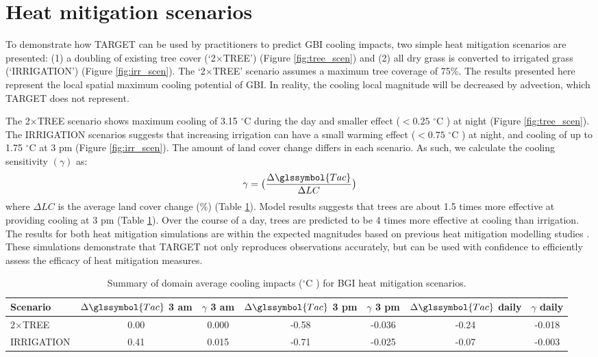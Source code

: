 \documentclass[final,3p,times,authoryear]{elsarticle}
\newcommand{\degreeC}{\ensuremath{^\circ}C }
\begin{document}
\section{Heat mitigation scenarios}

To demonstrate how TARGET can be used by practitioners  to predict GBI cooling impacts, two simple heat mitigation scenarios are presented: (1) a doubling of existing tree cover (`2$\times$TREE') (Figure \ref{fig:tree_scen}) and (2) all dry grass is converted to irrigated grass (`IRRIGATION') (Figure \ref{fig:irr_scen}). The `2$\times$TREE' scenario assumes a maximum tree coverage of 75\%.   The results presented here represent the local spatial maximum cooling potential of GBI. In reality, the cooling local magnitude will be decreased by advection, which TARGET does not represent. 

The 2$\times$TREE scenario  shows maximum cooling of  3.15 \degreeC during the day and smaller effect ($< 0.25$ \degreeC) at night (Figure \ref{fig:tree_scen}).  The IRRIGATION scenarios suggests that increasing irrigation can have a small warming effect ($< 0.75$ \degreeC) at night, and  cooling of up to  1.75 \degreeC at 3 pm (Figure \ref{fig:irr_scen}).  The amount of  land cover change differs in each scenario. As such, we calculate the cooling sensitivity $(\gamma)$ as:
\begin{equation}
\gamma = \big(\frac{\Delta \glssymbol{Tac}}{\Delta LC}\big)
\end{equation}where $\Delta LC$ is the average land cover change (\%) (Table \ref{tab:cooling_scen}). Model results suggests that trees  are about 1.5 times more effective at providing cooling at 3 pm (Table \ref{tab:cooling_scen}). Over the course of a day, trees are predicted to be 4 times more effective at cooling than irrigation. The results for both heat mitigation simulations are  within the expected magnitudes based on previous heat mitigation modelling studies \citep{grossman2010,middel2015urban,daniel2016,Broadbent}. These simulations demonstrate that TARGET not only reproduces observations accurately, but can be used with confidence to efficiently assess the efficacy of heat mitigation measures.   

\begin{table}
\begin{center}
\caption{Summary of domain average cooling impacts (\degreeC) for BGI heat mitigation scenarios.}
\begin{adjustbox}{width=0.75\textwidth}
\label{tab:cooling_scen}
\begin{tabular}{l | c c | c c | c c}
\hline
Scenario & $\Delta \glssymbol{Tac}$ 3 am & $\gamma$ 3 am & $\Delta \glssymbol{Tac}$ 3 pm &  $\gamma$ 3 pm & $\Delta \glssymbol{Tac}$ daily  & $\gamma$ daily \\
\hline
2$\times$TREE & 0.00 & 0.000 & -0.58 & -0.036 & -0.24 & -0.018   \\
IRRIGATION    & 0.41  & 0.015 & -0.71 & -0.025 & -0.07 & -0.003  \\
\hline
\end{tabular}

\end{adjustbox}
\end{center}
\end{table}
\end{document}

